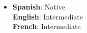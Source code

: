 \begin{itemize}[leftmargin=0.15in, label={}]
    \item{
        \textbf{Spanish}{: Native} \\
        \textbf{English}{: Intermediate} \\
        \textbf{French}{: Intermediate}
    }
\end{itemize}
